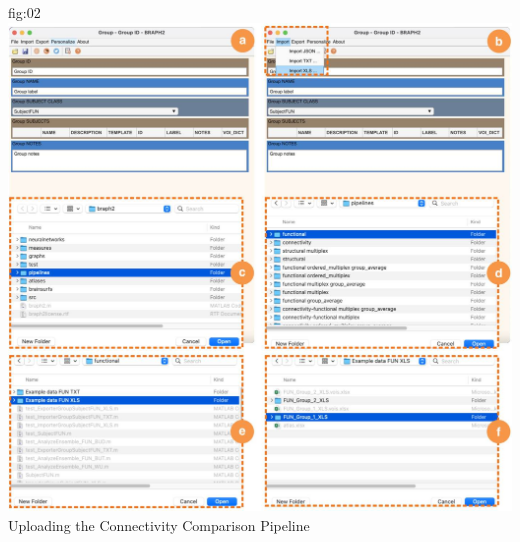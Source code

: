 \documentclass[justified]{tufte-handout}
\begin{document}
	{fig:02}
	{
	\includegraphics{fig02.jpg}
	}
	{Uploading the Connectivity Comparison Pipeline}
\end{document}
